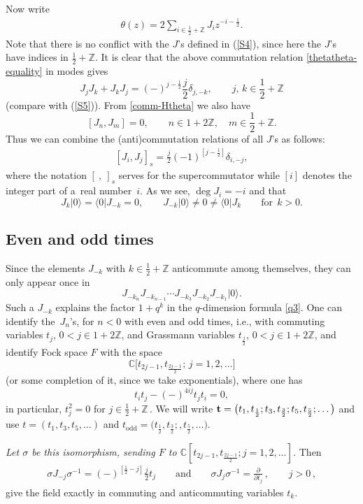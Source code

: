 \documentclass[pdftex]{sigma}
\numberwithin{equation}{section}
\begin{document}
Now write
\begin{gather}\label{theta(z)}
\theta(z)=2\sum_{i\in\frac{1}{2}+\mathbb{Z}}
J_iz^{-i-\frac{1}{2}} .
\end{gather}
Note that there is no conf\/lict with the $J$'s def\/ined in (\ref{S4}), since here the $J$'s
have indices in $\frac{1}{2}+\mathbb{Z}$.
It is clear that the above commutation
relation \eqref{thetatheta-equality} in modes gives
\[
J_jJ_k+J_kJ_j=(-)^{j-\frac{1}{2}}\frac{j}2 \delta_{j,-k},\qquad j,\,k\in \frac{1}{2}+\mathbb{Z}
\]
(compare with (\ref{S5})). From \eqref{comm-Htheta} we also have
\[
[J_n, J_m]=0 ,\qquad n\in 1+2\mathbb{Z},\quad  m\in \frac{1}{2}+\mathbb{Z} .
\]
Thus we can combine the (anti)commutation relations of all $J$'s as follows:
 \begin{gather}\label{supercurrent}
[J_i, J_j]_s = \frac{j}{2}(-1)^{[j-\frac 12]}\delta_{i,-j} ,
 \end{gather}
where the notation $[\ {,}\ ]_s$ serves for the supercommutator while
$[i]$ denotes the integer part of a~real number~$i$. As we see,
$\deg J_i=-i$
 and that
\[
J_k|0\rangle=\langle 0|J_{-k}=0,\qquad
J_{-k}|0\rangle\ne 0\ne\langle 0|J_{k} \qquad\mbox{for}\ \ k>0 .
\]

\subsection{Even and odd times} \label{Even and odd times}
Since the elements $J_{-k}$ with $k\in \frac{1}{2}+\mathbb{Z}$
anticommute among themselves, they can only
appear once in
\[
J_{-k_n}J_{-k_{n-1}}\cdots J_{-k_3}J_{-k_2}J_{-k_1}|0\rangle.
\]
Such a $J_{-k}$ explains the factor $1+q^k$ in the
$q$-dimension formula \eqref{q3}. One can identify the~$J_n$'s, for $n<0$ with even and odd times, i.e., with  commuting
variables $t_j$, $0<j\in 1+2\mathbb{Z}$, and Grassmann variables $t_{\frac{j}2}$, $0<j\in
1+2\mathbb{Z}$, and identify Fock space $F$ with the space
\[
\mathbb{C}\big[t_{2j-1},t_{\frac{2j-1}2};\, j=1,2,\ldots \big]
\]
(or some completion of it, since we take exponentials),
where one has
\[
t_it_j-(-)^{4ij}t_jt_i=0 ,
\]
in particular, $t_j^2=0$ for $j\in \frac12+\mathbb{Z}$\,.
We will write ${\bf t}=\bigl(t_1,t_{\frac 12};t_3,t_{\frac 32};t_5,t_{\frac
52};\dots \bigr)$ and use $t=\left(t_1,t_3,t_5,\dots \right)$ and
$t_\mathrm{odd}=\bigl(t_{\frac 12},t_{\frac 32};,t_{\frac
52},\dots \bigr)$.


{\it Let $\sigma$ be this isomorphism,
sending $F$ to $\mathbb{C}[t_{2j-1},t_{\frac{2j-1}2}; j=1,2,\ldots]$.}
Then
\begin{gather}\label{theta-xi}
\sigma J_{-j}\sigma^{-1}=(-)^{[\frac{1}{2}-j]}\frac{j}2t_j\qquad\mbox{and}\qquad
\sigma J_j\sigma^{-1}=\frac{\partial}{\partial t_j}\,,\qquad
j>0\,,
\end{gather}
give the f\/ield exactly in commuting and anticommuting variables
$t_k$.
\end{document}
